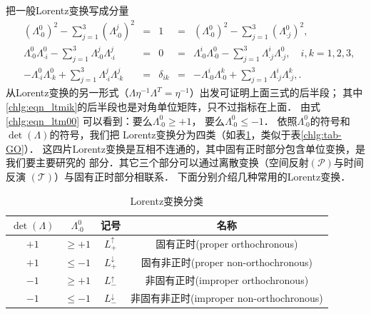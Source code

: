 把一般Lorentz变换写成分量
\begin{align}
    & (\Lambda^{0}_{\cdot 0})^2 -\sum_{j=1}^{3} (\Lambda^{j}_{\cdot 0})^2 &= & 1
    &{ =}& (\Lambda^{0}_{\cdot 0})^2 -\sum_{j=1}^{3} ({\Lambda^0_{\cdot j}})^2 , \label{chlg:eqn_ltm00} \\
    & \Lambda^{0}_{\cdot 0} \Lambda^{0}_{\cdot i} - \sum_{j=1}^{3} \Lambda^{j}_{\cdot 0}
    \Lambda^{j}_{\cdot i} &= &0 &{ =}& \Lambda^{i}_{\cdot 0} \Lambda^{0}_{\cdot 0}
    - \sum_{j=1}^{3} \Lambda^{i}_{\cdot j}   \Lambda^{0}_{\cdot j},
    \quad i,k=1,2,3, \label{chlg:eqn_ltm0i}  \\
    & -\Lambda^{0}_{\cdot i} \Lambda^{0}_{\cdot k} + \sum_{j=1}^{3} \Lambda^{j}_{\cdot i}
    \Lambda^{j}_{\cdot k} &= &\delta_{ik} &{ =}& -\Lambda^{i}_{\cdot 0} \Lambda^{k}_{\cdot 0}
    + \sum_{j=1}^{3} \Lambda^{i}_{\cdot j}  \Lambda^{k}_{\cdot j},
    \label{chlg:eqn_ltmik} .
\end{align}
从Lorentz变换的另一形式（$\Lambda \eta^{-1}\Lambda ^T  =\eta^{-1}$）出发可证明上面三式的后半段；
其中\eqref{chlg:eqn_ltmik}的后半段也是对角单位矩阵，只不过指标在上面．
由式\eqref{chlg:eqn_ltm00} 可以看到：要么$\Lambda^{0}_{\cdot 0} \geqslant +1$，
要么$\Lambda^{0}_{\cdot 0} \leqslant -1$．
依照$\Lambda^{0}_{\cdot 0}$的符号和$\det(\Lambda)$的符号，我们把
Lorentz变换分为四类（如表\ref{chlg:tab_lorentz}，类似于表\ref{chlg:tab-GO}）．
这四片Lorentz变换是互相不连通的，其中固有正时部分包含单位变换，是我们要主要研究的
部分．其它三个部分可以通过离散变换（空间反射$(\mathcal{P})$与时间反演
$(\mathcal{T})$）与固有正时部分相联系．
下面分别介绍几种常用的Lorentz变换．


\begin{table}[!htb]
    \centering
    \caption{Lorentz变换分类} \label{chlg:tab_lorentz}
    \begin{tabular}{|c|c|c|c|}
        \hline
        $\det(\Lambda)$ & $\Lambda^{0}_{\cdot 0}$ & 记号 & 名称 \\ \hline
        $+1$ & $\geqslant +1$ &    $L^{\uparrow}_{+}$   & 固有正时(proper orthochronous) \\ \hline
        $+1$ & $\leqslant -1$ &    $L^{\downarrow}_{+}$ & 固有非正时(proper non-orthochronous) \\ \hline
        $-1$ & $\geqslant +1$ &    $L^{\uparrow}_{-}$   & 非固有正时(improper orthochronous) \\ \hline
        $-1$ & $\leqslant -1$ &    $L^{\downarrow}_{-}$ & 非固有非正时(improper non-orthochronous) \\ \hline
    \end{tabular}
\end{table}




